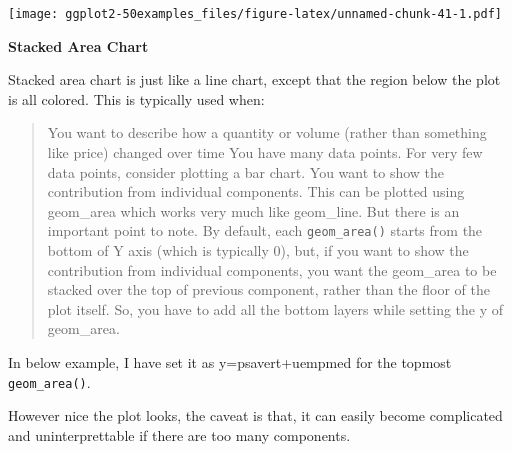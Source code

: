 \documentclass[a4paper]{article}
\begin{document}
\texttt{[image: ggplot2-50examples\_files/figure-latex/unnamed-chunk-41-1.pdf]}
\newpage

\textbf{Stacked Area Chart}

Stacked area chart is just like a line chart, except that the region
below the plot is all colored. This is typically used when:

\begin{quote}
You want to describe how a quantity or volume (rather than something
like price) changed over time You have many data points. For very few
data points, consider plotting a bar chart. You want to show the
contribution from individual components. This can be plotted using
geom\_area which works very much like geom\_line. But there is an
important point to note. By default, each \texttt{geom\_area()} starts
from the bottom of Y axis (which is typically 0), but, if you want to
show the contribution from individual components, you want the
geom\_area to be stacked over the top of previous component, rather than
the floor of the plot itself. So, you have to add all the bottom layers
while setting the y of geom\_area.
\end{quote}

In below example, I have set it as y=psavert+uempmed for the topmost
\texttt{geom\_area()}.

However nice the plot looks, the caveat is that, it can easily become
complicated and uninterprettable if there are too many components.
\end{document}
